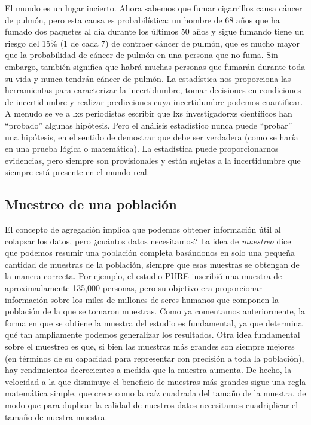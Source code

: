 \documentclass[
  12pt,
]{book}
\theoremstyle{definition}
\theoremstyle{definition}
\theoremstyle{definition}
\theoremstyle{remark}
\begin{document}
El mundo es un lugar incierto. Ahora sabemos que fumar cigarrillos causa cáncer de pulmón, pero esta causa es probabilística: un hombre de 68 años que ha fumado dos paquetes al día durante los últimos 50 años y sigue fumando tiene un riesgo del 15\% (1 de cada 7) de contraer cáncer de pulmón, que es mucho mayor que la probabilidad de cáncer de pulmón en una persona que no fuma. Sin embargo, también significa que habrá muchas personas que fumarán durante toda su vida y nunca tendrán cáncer de pulmón. La estadística nos proporciona las herramientas para caracterizar la incertidumbre, tomar decisiones en condiciones de incertidumbre y realizar predicciones cuya incertidumbre podemos cuantificar.
A menudo se ve a lxs periodistas escribir que lxs investigadorxs científicos han ``probado'' algunas hipótesis. Pero el análisis estadístico nunca puede ``probar'' una hipótesis, en el sentido de demostrar que debe ser verdadera (como se haría en una prueba lógica o matemática). La estadística puede proporcionarnos evidencias, pero siempre son provisionales y están sujetas a la incertidumbre que siempre está presente en el mundo real.

\hypertarget{muestreo-de-una-poblaciuxf3n}{%
\subsection{Muestreo de una población}\label{muestreo-de-una-poblaciuxf3n}}

El concepto de agregación implica que podemos obtener información útil al colapsar los datos, pero ¿cuántos datos necesitamos? La idea de \emph{muestreo} dice que podemos resumir una población completa basándonos en solo una pequeña cantidad de muestras de la población, siempre que esas muestras se obtengan de la manera correcta. Por ejemplo, el estudio PURE inscribió una muestra de aproximadamente 135,000 personas, pero su objetivo era proporcionar información sobre los miles de millones de seres humanos que componen la población de la que se tomaron muestras. Como ya comentamos anteriormente, la forma en que se obtiene la muestra del estudio es fundamental, ya que determina qué tan ampliamente podemos generalizar los resultados. Otra idea fundamental sobre el muestreo es que, si bien las muestras más grandes son siempre mejores (en términos de su capacidad para representar con precisión a toda la población), hay rendimientos decrecientes a medida que la muestra aumenta. De hecho, la velocidad a la que disminuye el beneficio de muestras más grandes sigue una regla matemática simple, que crece como la raíz cuadrada del tamaño de la muestra, de modo que para duplicar la calidad de nuestros datos necesitamos cuadriplicar el tamaño de nuestra muestra.
\end{document}
